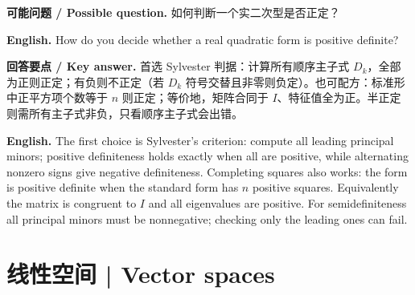 \documentclass[UTF8,11pt,a4paper]{ctexart}
\newcommand{\EN}[1]{\par\noindent\textbf{English.} #1\par}
\newcommand{\ASK}[4]{\par\noindent\textbf{可能问题 / Possible question.} #1\par\EN{#2}\noindent\textbf{回答要点 / Key answer.} #3\par\EN{#4}\medskip}
\begin{document}
\ASK{如何判断一个实二次型是否正定？}{How do you decide whether a real quadratic form is positive definite?}{首选 Sylvester 判据：计算所有顺序主子式 $D_k$，全部为正则正定；有负则不正定（若 $D_k$ 符号交替且非零则负定）。也可配方：标准形中正平方项个数等于 $n$ 则正定；等价地，矩阵合同于 $I$、特征值全为正。半正定则需所有主子式非负，只看顺序主子式会出错。}{The first choice is Sylvester's criterion: compute all leading principal minors; positive definiteness holds exactly when all are positive, while alternating nonzero signs give negative definiteness. Completing squares also works: the form is positive definite when the standard form has $n$ positive squares. Equivalently the matrix is congruent to $I$ and all eigenvalues are positive. For semidefiniteness all principal minors must be nonnegative; checking only the leading ones can fail.}

\section{线性空间 | Vector spaces}
\end{document}
